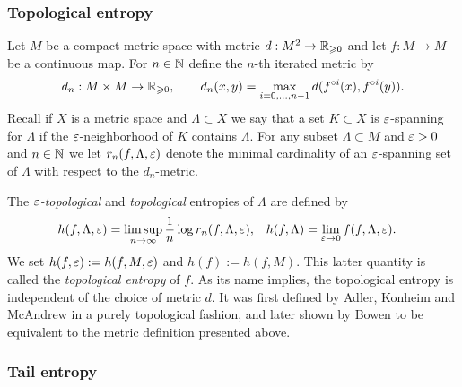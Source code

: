 \documentclass[reqno]{amsart}
\renewcommand\ge{\geqslant} \renewcommand\le{\leqslant}
\renewcommand\~[1]{\widetilde{#1}}
\begin{document}
\subsubsection{Topological entropy}

Let $M$ be a compact metric space with metric $d:M^2\to\R_{\ge0}$ and
let $f:M\to M$ be a continuous map. For $n\in{\mathbb N}$ define the $n$-th
iterated metric by
\begin{equation}
  d_n:M\times M\to\R_{\ge0}, \qquad d_n(x,y)=\max_{i=0,\ldots,n-1} d(f^{\circ i}(x),f^{\circ i}(y)).
\end{equation}
Recall if $X$ is a metric space and $\Lambda\subset X$ we say that a
set $K\subset X$ is $\varepsilon$-spanning for $\Lambda$ if the
$\varepsilon$-neighborhood of $K$ contains $\Lambda$. For any subset
$\Lambda\subset M$ and $\varepsilon>0$ and $n\in{\mathbb N}$ we let $r_n(f,\Lambda,\varepsilon)$
denote the minimal cardinality of an $\varepsilon$-spanning set of $\Lambda$
with respect to the $d_n$-metric.

The \emph{$\varepsilon$-topological} and \emph{topological} entropies of
$\Lambda$ are defined by
\begin{align}
  h(f,\Lambda,\varepsilon) &= \limsup_{n\to\infty} \frac1n \log r_n(f,\Lambda,\varepsilon), & h(f,\Lambda) &= \lim_{\varepsilon\to0} f(f,\Lambda,\varepsilon).
\end{align}
We set $h(f,\varepsilon):=h(f,M,\varepsilon)$ and $h(f):=h(f,M)$. This latter quantity
is called the \emph{topological entropy} of $f$. As its name implies,
the topological entropy is independent of the choice of metric $d$. It
was first defined by Adler, Konheim and McAndrew \cite{akm:entropy} in
a purely topological fashion, and later shown by Bowen
\cite{bowen:entropy-group} to be equivalent to the metric definition
presented above.

\subsubsection{Tail entropy}
\end{document}
